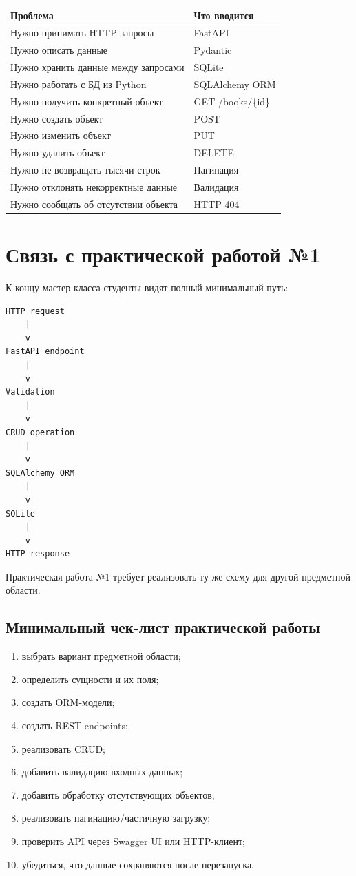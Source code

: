 \documentclass[12pt,a4paper]{article}
\begin{document}
\begin{longtable}{@{}p{}p{}@{}}
\toprule
Проблема & Что вводится\\
\midrule
Нужно принимать HTTP-запросы & FastAPI\\
Нужно описать данные & Pydantic\\
Нужно хранить данные между запросами & SQLite\\
Нужно работать с БД из Python & SQLAlchemy ORM\\
Нужно получить конкретный объект & GET /books/\{id\}\\
Нужно создать объект & POST\\
Нужно изменить объект & PUT\\
Нужно удалить объект & DELETE\\
Нужно не возвращать тысячи строк & Пагинация\\
Нужно отклонять некорректные данные & Валидация\\
Нужно сообщать об отсутствии объекта & HTTP 404\\
\bottomrule
\end{longtable}

\section{Связь с практической работой №1}
К концу мастер-класса студенты видят полный минимальный путь:
\begin{verbatim}
HTTP request
    |
    v
FastAPI endpoint
    |
    v
Validation
    |
    v
CRUD operation
    |
    v
SQLAlchemy ORM
    |
    v
SQLite
    |
    v
HTTP response
\end{verbatim}

Практическая работа №1 требует реализовать ту же схему для другой предметной области.

\subsection{Минимальный чек-лист практической работы}
\begin{enumerate}
    \item выбрать вариант предметной области;
    \item определить сущности и их поля;
    \item создать ORM-модели;
    \item создать REST endpoints;
    \item реализовать CRUD;
    \item добавить валидацию входных данных;
    \item добавить обработку отсутствующих объектов;
    \item реализовать пагинацию/частичную загрузку;
    \item проверить API через Swagger UI или HTTP-клиент;
    \item убедиться, что данные сохраняются после перезапуска.
\end{enumerate}
\end{document}
